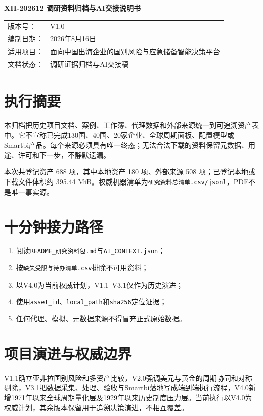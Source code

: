 \documentclass[UTF8,openany,oneside,11pt]{ctexbook}
\begin{document}
\begin{titlepage}
\centering\vspace*{2.2cm}
{\Huge\bfseries\color{DeepBlue} XH-202612 调研资料归档与AI交接说明书\par}
\vspace{0.8cm}{\Large 证据原件、数据资产、许可边界与接力入口\par}
\vfill
\begin{tabular}{p{3cm}p{11cm}}
版本号：& V1.0\\
编制日期：& 2026年8月16日\\
适用项目：& 面向中国出海企业的国别风险与应急储备智能决策平台\\
文档状态：& 调研证据归档与AI交接稿\\
\end{tabular}
\vfill
\end{titlepage}
\frontmatter\tableofcontents\mainmatter
\chapter{执行摘要}
本归档把历史项目文档、案例、工作簿、代理数据和外部来源统一到可追溯资产表中。它不宣称已完成130国、40国、20家企业、全球周期面板、配置模型或Smartbi产品。每个来源必须具有唯一终态；无法合法下载的资料保留元数据、用途、许可和下一步，不静默遗漏。

本次共登记资产 688 项，其中本地资产 180 项、外部来源 508 项；已登记本地或下载文件体积约 395.44 MiB。权威机器清单为\texttt{研究资料总清单.csv/jsonl}，PDF不是唯一事实源。

\chapter{十分钟接力路径}
\begin{enumerate}[leftmargin=2.5em]
\item 阅读\texttt{README\_研究资料包.md}与\texttt{AI\_CONTEXT.json}；
\item 按\texttt{缺失受限与待办清单.csv}排除不可用资料；
\item 以V4.0为当前权威计划，V1.1--V3.1仅作为历史演进；
\item 使用\texttt{asset\_id}、\texttt{local\_path}和\texttt{sha256}定位证据；
\item 任何代理、模拟、元数据来源不得冒充正式原始数据。
\end{enumerate}

\chapter{项目演进与权威边界}
V1.1确立亚非拉国别风险和多资产比较，V2.0强调美元与黄金的周期协同和对称剔除，V3.1把数据采集、处理、验收与Smartbi落地写成端到端执行流程，V4.0新增1971年以来全球周期量化层及1929年以来历史制度压力层。当前执行以V4.0为权威计划，其余版本保留用于追溯决策演进，不相互覆盖。
\end{document}
